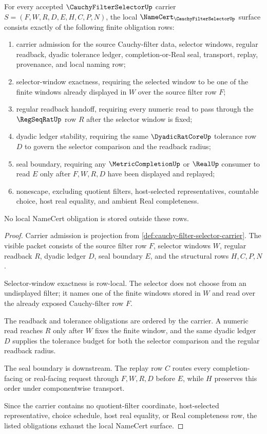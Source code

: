 \begin{theorem}
\label{thm:cauchy-filter-selector-namecert-obligations}
For every accepted $\CauchyFilterSelectorUp$ carrier $S=(F,W,R,D,E,H,C,P,N)$, the local $\NameCert_{\CauchyFilterSelectorUp}$ surface consists exactly of the following finite obligation rows:
\begin{enumerate}
\item carrier admission for the source Cauchy-filter data, selector windows, regular readback, dyadic tolerance ledger, completion-or-Real seal, transport, replay, provenance, and local naming row;
\item selector-window exactness, requiring the selected window to be one of the finite windows already displayed in $W$ over the source filter row $F$;
\item regular readback handoff, requiring every numeric read to pass through the $\RegSeqRatUp$ row $R$ after the selector window is fixed;
\item dyadic ledger stability, requiring the same $\DyadicRatCoreUp$ tolerance row $D$ to govern the selector comparison and the readback radius;
\item seal boundary, requiring any $\MetricCompletionUp$ or $\RealUp$ consumer to read $E$ only after $F,W,R,D$ have been displayed and replayed;
\item nonescape, excluding quotient filters, host-selected representatives, countable choice, host real equality, and ambient Real completeness.
\end{enumerate}
No local NameCert obligation is stored outside these rows.
\end{theorem}
\begin{proof}
Carrier admission is projection from \autoref{def:cauchy-filter-selector-carrier}. The visible packet consists of the source filter row $F$, selector windows $W$, regular readback $R$, dyadic ledger $D$, seal boundary $E$, and the structural rows $H,C,P,N$.

Selector-window exactness is row-local. The selector does not choose from an undisplayed filter; it names one of the finite windows stored in $W$ and read over the already exposed Cauchy-filter row $F$.

The readback and tolerance obligations are ordered by the carrier. A numeric read reaches $R$ only after $W$ fixes the finite window, and the same dyadic ledger $D$ supplies the tolerance budget for both the selector comparison and the regular readback radius.

The seal boundary is downstream. The replay row $C$ routes every completion-facing or real-facing request through $F,W,R,D$ before $E$, while $H$ preserves this order under componentwise transport.

Since the carrier contains no quotient-filter coordinate, host-selected representative, choice schedule, host real equality, or Real completeness row, the listed obligations exhaust the local NameCert surface.
\end{proof}


